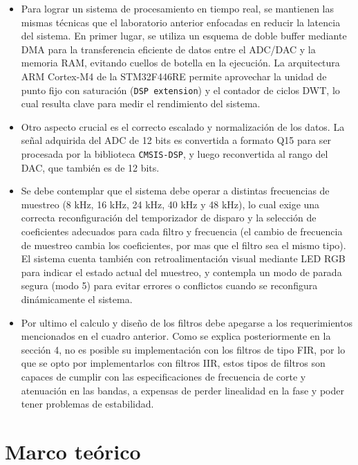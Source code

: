 \documentclass[12pt]{article}
\begin{document}
	\begin{itemize}
		\item Para lograr un sistema de procesamiento en tiempo real, se mantienen las mismas técnicas que el laboratorio anterior enfocadas en reducir la latencia del sistema. En primer lugar, se utiliza un esquema de doble buffer mediante DMA para la transferencia eficiente de datos entre el ADC/DAC y la memoria RAM, evitando cuellos de botella en la ejecución. La arquitectura ARM Cortex-M4 de la STM32F446RE permite aprovechar la unidad de punto fijo con saturación (\texttt{DSP extension}) y el contador de ciclos DWT, lo cual resulta clave para medir el rendimiento del sistema.
		
		\item Otro aspecto crucial es el correcto escalado y normalización de los datos. La señal adquirida del ADC de 12 bits es convertida a formato Q15 para ser procesada por la biblioteca \texttt{CMSIS-DSP}, y luego reconvertida al rango del DAC, que también es de 12 bits.\newpage
		
		\item Se debe contemplar que el sistema debe operar a distintas frecuencias de muestreo (8 kHz, 16 kHz, 24 kHz, 40 kHz y 48 kHz), lo cual exige una correcta reconfiguración del temporizador de disparo y la selección de coeficientes adecuados para cada filtro y frecuencia (el cambio de frecuencia de muestreo cambia los coeficientes, por mas que el filtro sea el mismo tipo). El sistema cuenta también con retroalimentación visual mediante LED RGB para indicar el estado actual del muestreo, y contempla un modo de parada segura (modo 5) para evitar errores o conflictos cuando se reconfigura dinámicamente el sistema.
		
		\item Por ultimo el calculo y diseño de los filtros debe apegarse a los requerimientos mencionados en el cuadro anterior. Como se explica posteriormente en la sección 4, no es posible su implementación con los filtros de tipo FIR, por lo que se opto por implementarlos con filtros IIR, estos tipos de filtros son capaces de cumplir con las especificaciones de frecuencia de corte y atenuación en las bandas, a expensas de perder linealidad en la fase y poder tener problemas de estabilidad.
	\end{itemize}
	
	\section{Marco teórico}
	
\end{document}
